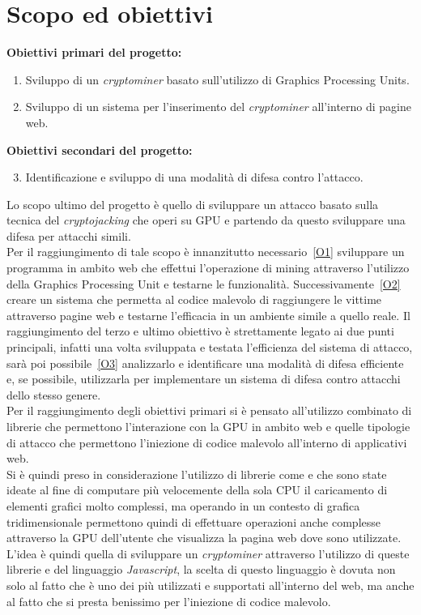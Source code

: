 \documentclass[
11pt, %
oneside, %
italian, %
onehalfspacing,%
headsepline, %
]{MastersDoctoralThesis} %
\begin{document}
{\chapter{Scopo ed obiettivi}}
\textbf{Obiettivi primari del progetto:}
\begin{enumerate}[label= (\roman*)]
        \item\label{O1} Sviluppo di un \emph{cryptominer} basato sull'utilizzo di Graphics Processing Units.
        \item\label{O2} Sviluppo di un sistema per l'inserimento del \emph{cryptominer} all'interno di pagine web.
\end{enumerate}
\textbf{Obiettivi secondari del progetto:}
\begin{enumerate}[label= (\roman*)]
        \setcounter{enumi}{2}
        \item\label{O3} Identificazione e sviluppo di una modalità di difesa contro l'attacco.
\end{enumerate}
Lo scopo ultimo del progetto è quello di sviluppare un attacco basato sulla tecnica del \emph{cryptojacking} che operi su GPU e partendo da questo sviluppare una difesa per attacchi simili.\\
Per il raggiungimento di tale scopo è innanzitutto necessario~\ref{O1} sviluppare un programma in ambito web che effettui l'operazione di mining attraverso l'utilizzo della Graphics Processing Unit e testarne le funzionalità. Successivamente~\ref{O2} creare un sistema che permetta al codice malevolo di raggiungere le vittime attraverso pagine web e testarne l'efficacia in un ambiente simile a quello reale. Il raggiungimento del terzo e ultimo obiettivo è strettamente legato ai due punti principali, infatti una volta sviluppata e testata l'efficienza del sistema di attacco, sarà poi possibile~\ref{O3} analizzarlo e identificare una modalità di difesa efficiente e, se possibile, utilizzarla per implementare un sistema di difesa contro attacchi dello stesso genere.\\
Per il raggiungimento degli obiettivi primari si è pensato all'utilizzo combinato di librerie che permettono l'interazione con la GPU in ambito web e quelle tipologie di attacco che permettono l'iniezione di codice malevolo all'interno di applicativi web.\\
Si è quindi preso in considerazione l'utilizzo di librerie come  e  che sono state ideate al fine di computare più velocemente della sola CPU il caricamento di elementi grafici molto complessi, ma operando in un contesto di grafica tridimensionale permettono quindi di effettuare operazioni anche complesse attraverso la GPU dell'utente che visualizza la pagina web dove sono utilizzate. L'idea è quindi quella di sviluppare un \emph{cryptominer} attraverso l'utilizzo di queste librerie e del linguaggio \emph{Javascript}, la scelta di questo linguaggio è dovuta non solo al fatto che è uno dei più utilizzati e supportati all'interno del web, ma anche al fatto che si presta benissimo per l'iniezione di codice malevolo.\\
\end{document}

